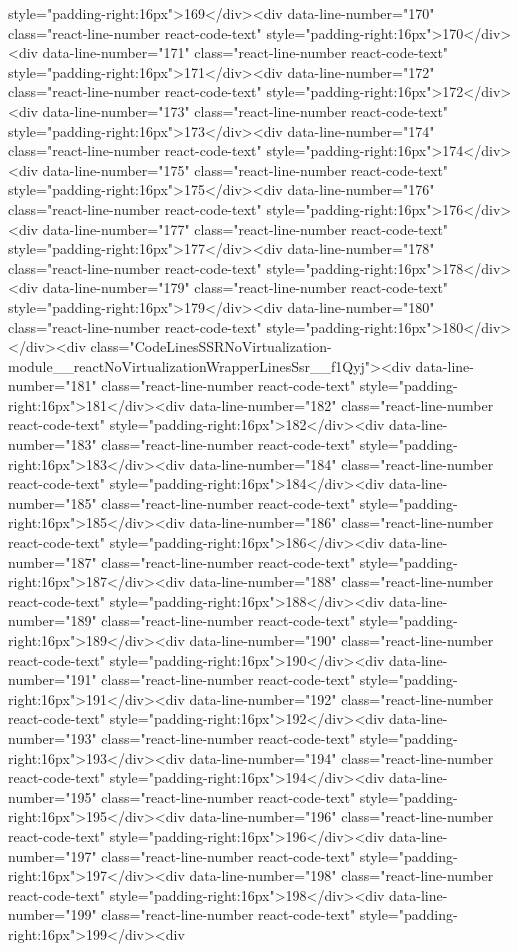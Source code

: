 {{{{{{{style="padding-right:16px">169</div><div data-line-number="170" class="react-line-number react-code-text" style="padding-right:16px">170</div><div data-line-number="171" class="react-line-number react-code-text" style="padding-right:16px">171</div><div data-line-number="172" class="react-line-number react-code-text" style="padding-right:16px">172</div><div data-line-number="173" class="react-line-number react-code-text" style="padding-right:16px">173</div><div data-line-number="174" class="react-line-number react-code-text" style="padding-right:16px">174</div><div data-line-number="175" class="react-line-number react-code-text" style="padding-right:16px">175</div><div data-line-number="176" class="react-line-number react-code-text" style="padding-right:16px">176</div><div data-line-number="177" class="react-line-number react-code-text" style="padding-right:16px">177</div><div data-line-number="178" class="react-line-number react-code-text" style="padding-right:16px">178</div><div data-line-number="179" class="react-line-number react-code-text" style="padding-right:16px">179</div><div data-line-number="180" class="react-line-number react-code-text" style="padding-right:16px">180</div></div><div class="CodeLinesSSRNoVirtualization-module__reactNoVirtualizationWrapperLinesSsr__f1Qyj"><div data-line-number="181" class="react-line-number react-code-text" style="padding-right:16px">181</div><div data-line-number="182" class="react-line-number react-code-text" style="padding-right:16px">182</div><div data-line-number="183" class="react-line-number react-code-text" style="padding-right:16px">183</div><div data-line-number="184" class="react-line-number react-code-text" style="padding-right:16px">184</div><div data-line-number="185" class="react-line-number react-code-text" style="padding-right:16px">185</div><div data-line-number="186" class="react-line-number react-code-text" style="padding-right:16px">186</div><div data-line-number="187" class="react-line-number react-code-text" style="padding-right:16px">187</div><div data-line-number="188" class="react-line-number react-code-text" style="padding-right:16px">188</div><div data-line-number="189" class="react-line-number react-code-text" style="padding-right:16px">189</div><div data-line-number="190" class="react-line-number react-code-text" style="padding-right:16px">190</div><div data-line-number="191" class="react-line-number react-code-text" style="padding-right:16px">191</div><div data-line-number="192" class="react-line-number react-code-text" style="padding-right:16px">192</div><div data-line-number="193" class="react-line-number react-code-text" style="padding-right:16px">193</div><div data-line-number="194" class="react-line-number react-code-text" style="padding-right:16px">194</div><div data-line-number="195" class="react-line-number react-code-text" style="padding-right:16px">195</div><div data-line-number="196" class="react-line-number react-code-text" style="padding-right:16px">196</div><div data-line-number="197" class="react-line-number react-code-text" style="padding-right:16px">197</div><div data-line-number="198" class="react-line-number react-code-text" style="padding-right:16px">198</div><div data-line-number="199" class="react-line-number react-code-text" style="padding-right:16px">199</div><div }}}}}}}
